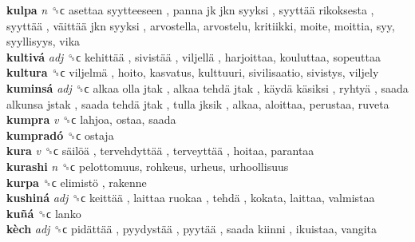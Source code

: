 \textbf{kulpa} \emph{n}  ␝ϲ   asettaa syytteeseen ,  panna jk jkn syyksi ,  syyttää rikoksesta ,  syyttää ,  väittää jkn syyksi , arvostella, arvostelu, kritiikki, moite, moittia, syy, syyllisyys, vika  \\
\textbf{kultivá} \emph{adj}  ␝ϲ   kehittää ,  sivistää ,  viljellä , harjoittaa, kouluttaa, sopeuttaa  \\
\textbf{kultura} ␝ϲ   viljelmä , hoito, kasvatus, kulttuuri, sivilisaatio, sivistys, viljely  \\
\textbf{kuminsá} \emph{adj}  ␝ϲ   alkaa olla jtak ,  alkaa tehdä jtak ,  käydä käsiksi ,  ryhtyä ,  saada alkunsa jstak ,  saada tehdä jtak ,  tulla jksik , alkaa, aloittaa, perustaa, ruveta  \\
\textbf{kumpra} \emph{v}  ␝ϲ  lahjoa, ostaa, saada  \\
\textbf{kumpradó} ␝ϲ  ostaja  \\
\textbf{kura} \emph{v}  ␝ϲ   säilöä ,  tervehdyttää ,  terveyttää , hoitaa, parantaa  \\
\textbf{kurashi} \emph{n}  ␝ϲ  pelottomuus, rohkeus, urheus, urhoollisuus  \\
\textbf{kurpa} ␝ϲ   elimistö , rakenne  \\
\textbf{kushiná} \emph{adj}  ␝ϲ   keittää ,  laittaa ruokaa ,  tehdä , kokata, laittaa, valmistaa  \\
\textbf{kuñá} ␝ϲ  lanko  \\
\textbf{kèch} \emph{adj}  ␝ϲ   pidättää ,  pyydystää ,  pyytää ,  saada kiinni , ikuistaa, vangita  \\
